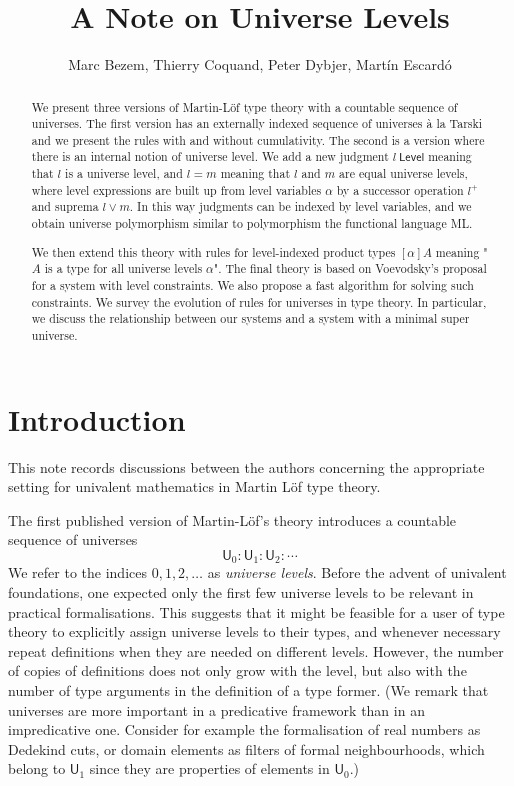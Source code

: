 \documentclass[11pt,a4paper]{article}
\def\UU{\mathsf{U}}
\def\Level{\mathsf{Level}}
\begin{document}
\title{A Note on Universe Levels}

\author{Marc Bezem, Thierry Coquand, Peter Dybjer, Mart\'in Escard\'o}
\date{}
\maketitle

\begin{abstract}
We present three versions of Martin-Löf type theory with a countable sequence of universes. The first version has an externally indexed sequence of universes \`a la Tarski and we present the rules with and without cumulativity. The second is a version where there is an internal notion of universe level. We add a new judgment $l\ \Level$ meaning that $l$ is a universe level, and $l = m$ meaning that $l$ and $m$ are equal universe levels, where level expressions are built up from level variables $\alpha$ by a successor operation $l^+$ and suprema $l \vee m$. In this way judgments can be indexed by level variables, and we obtain universe polymorphism similar to polymorphism the functional language ML. 

We then extend this theory with rules for level-indexed product types $[\alpha]A$ meaning "$A$ is a type for all universe levels $\alpha$". The final theory is based on Voevodsky's proposal for a system with level constraints. We also propose a fast algorithm for solving such constraints. We survey the evolution of rules for universes in type theory. In particular, we discuss the relationship between our systems and a system with a minimal super universe.
\end{abstract}


\section{Introduction}\label{sec:intros}

This note records discussions between the authors concerning the appropriate setting for univalent mathematics in Martin Löf type theory. 

The first published version of Martin-Löf's theory \cite{martinlof:predicative} introduces a countable sequence of universes
$$
\UU_0 : \UU_1 : \UU_2 : \cdots
$$
We refer to the indices $0, 1, 2, \ldots$ as {\em universe levels}. Before the advent of univalent foundations, one expected only the first few universe levels to be relevant in practical formalisations. This suggests that it might be feasible for a user of type theory to explicitly assign universe levels to their types, and whenever necessary repeat definitions when they are needed on different levels. However, the number of copies of definitions does not only grow with the level, but also with the number of type arguments in the definition of a type former. (We remark that universes are more important in a predicative framework than in an impredicative one. Consider for example the formalisation of real numbers as Dedekind cuts, or domain elements as filters of formal neighbourhoods, which belong to $\UU_1$ since they are properties of elements in $\UU_0$.)
\end{document}
